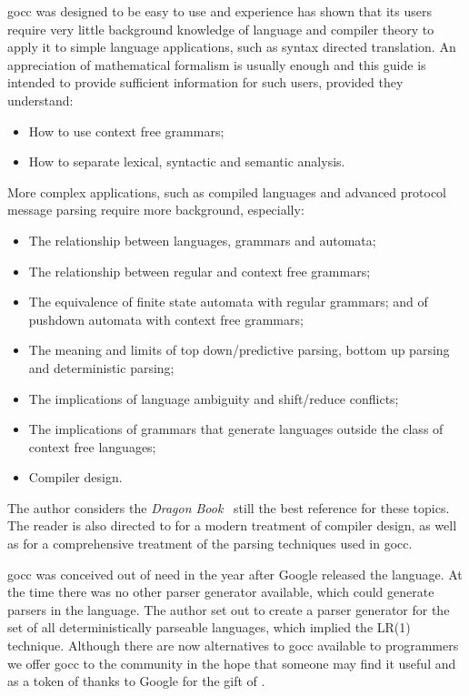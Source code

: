\documentclass[12pt]{article}
\begin{document}
	gocc was designed to be easy to use and experience has shown that its users require very little background knowledge of language and compiler theory to apply it to simple language applications, such as syntax directed translation. An appreciation of mathematical formalism is usually enough and this guide is intended to provide sufficient information for such users, provided they understand:
	\begin{itemize}
		\item How to use context free grammars;
		\item How to separate lexical, syntactic and semantic analysis.
	\end{itemize}

	More complex applications, such as compiled languages and advanced protocol message parsing require more background, especially:
	\begin{itemize}
		\item The relationship between languages, grammars and automata;
		\item The relationship between regular and context free grammars;
		\item The equivalence of finite state automata with regular grammars; and of pushdown automata with context free grammars;
		\item The meaning and limits of top down/predictive parsing, bottom up parsing and deterministic parsing;
		\item The implications of language ambiguity and shift/reduce conflicts;
		\item The implications of grammars that generate languages outside the class of context free languages;
		\item Compiler design.
	\end{itemize}

	The author  considers the {\em Dragon Book}~\cite{Dragon Book} still the best reference for these topics. The reader is also directed to \cite{Modern Compiler Design} for a modern treatment of compiler design, as well as \cite{Parsing} for a comprehensive treatment of the parsing techniques used in gocc.

	gocc was conceived out of need in the year after Google released the \Go language. At the time there was no other parser generator available, which could generate parsers in the \Go language. The author set out to create a parser generator for the set of all deterministically parseable languages, which implied the LR(1) technique. Although there are now alternatives to gocc available to \Go programmers we offer gocc to the community in the hope that someone may find it useful and as a token of thanks to Google for the gift of \Go.
\end{document}
